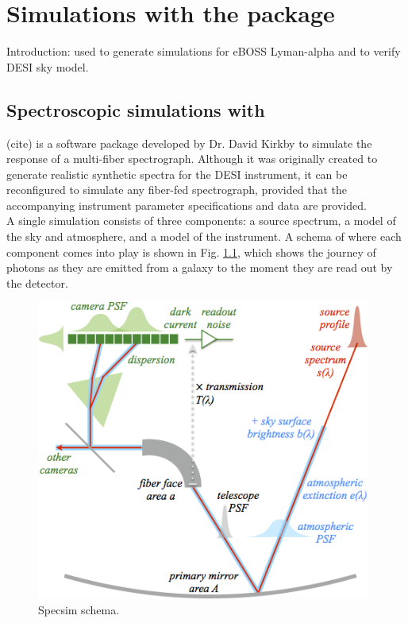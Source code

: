 \chapter{Simulations with the  package}

Introduction: used to generate simulations for eBOSS Lyman-alpha and to verify DESI sky model. 

\section{Spectroscopic simulations with }

 (cite) is a software package developed by Dr. David Kirkby to simulate the response of a multi-fiber spectrograph. Although it was originally created to generate realistic synthetic spectra for the DESI instrument, it can be reconfigured to simulate any fiber-fed spectrograph, provided that the accompanying instrument parameter specifications and data are provided.\\

A single simulation consists of three components: a source spectrum, a model of the sky and atmosphere, and a model of the instrument. A schema of where each component comes into play is shown in Fig. \ref{fig:schema}, which shows the journey of photons as they are emitted from a galaxy to the moment they are read out by the detector.\\

\begin{figure}
\centering
\includegraphics[width=11cm]{images/specsim/overview.png}
\caption{Specsim schema.}
\label{fig:schema}
\end{figure}

